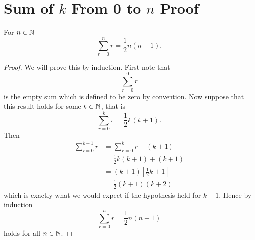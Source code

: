 \section{Sum of \texorpdfstring{\(k\)}{k} From 0 to \texorpdfstring{\(n\)}{n} Proof}\label{sec:proof sum 0 to n of r is 0.5 n(n+1)}
    \begin{theorem}{}{}
        For \(n \in \mathbb{N}\)
        \[\sum_{r=0}^{n} r = \frac{1}{2}n(n + 1).\]
    \end{theorem}
    \begin{proof}
        We will prove this by induction.
        First note that
        \[\sum_{r=0}^{0}r\]
        is the empty sum which is defined to be zero by convention.
        Now suppose that this result holds for some \(k \in \mathbb{N}\), that is
        \[\sum_{r = 0}^{k} r = \frac{1}{2}k(k + 1).\]
        Then
        \begin{align*}
            \sum_{r = 0}^{k + 1} r &= \sum_{r = 0}^{k} r + (k + 1)\\
            &= \frac{1}{2}k(k + 1) + (k + 1)\\
            &= (k + 1)\left[\frac{1}{2}k + 1\right]\\
            &= \frac{1}{2}(k + 1)(k + 2)
        \end{align*}
        which is exactly what we would expect if the hypothesis held for \(k + 1\).
        Hence by induction
        \[\sum_{r=0}^{n} r = \frac{1}{2}n(n + 1)\]
        holds for all \(n\in\mathbb{N}\).
    \end{proof}